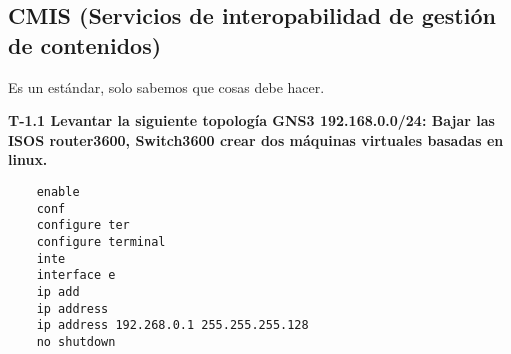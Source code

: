 \subsection{CMIS (Servicios de interopabilidad de gestión de contenidos)}
Es un estándar, solo sabemos que cosas debe hacer.

\textbf{T-1.1 Levantar la siguiente topología GNS3 192.168.0.0/24: Bajar las ISOS router3600, Switch3600 crear dos máquinas virtuales basadas en linux. }
\begin{lstlisting}
    enable
    conf 
    configure ter 
    configure terminal 
    inte
    interface e 
    ip add 
    ip address
    ip address 192.268.0.1 255.255.255.128
    no shutdown
\end{lstlisting}